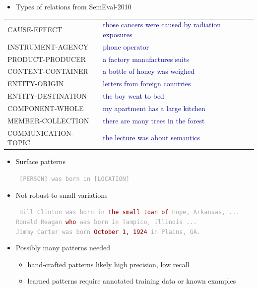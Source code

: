 \documentclass[landscape]{jhuslides3C}
\newcommand{\example}[1]{\textcolor{darkblue}{\rm #1}}
\begin{document}

\vfill
\begin{itemize}
\item Types of relations from SemEval-2010
\end{itemize}
\vfill
\begin{tabular}{ll}
\small CAUSE-EFFECT & \example{those cancers were caused by radiation exposures} \\
\small INSTRUMENT-AGENCY & \example{phone operator} \\
\small PRODUCT-PRODUCER & \example{a factory manufactures suits} \\
\small CONTENT-CONTAINER & \example{a bottle of honey was weighed} \\
\small ENTITY-ORIGIN & \example{letters from foreign countries} \\
\small ENTITY-DESTINATION & \example{the boy went to bed} \\
\small COMPONENT-WHOLE & \example{my apartment has a large kitchen}  \\
\small MEMBER-COLLECTION & \example{there are many trees in the forest}  \\
\small COMMUNICATION-TOPIC & \example{the lecture was about semantics}  \\
\end{tabular}
\vfill


\vfill
\begin{itemize}
\item Surface patterns
\textcolor{darkgrey}{\begin{flushleft} \tt
[PERSON] was born in [LOCATION]\\
\end{flushleft}}
\item Not robust to small variations
\textcolor{darkgrey}{\begin{flushleft} \tt
Bill Clinton was born in \textcolor{darkred}{the small town of} Hope, Arkansas, ...\\
Ronald Reagan \textcolor{darkred}{who} was born in Tampico, Illinois ...\\
Jimmy Carter was born \textcolor{darkred}{October 1, 1924} in Plains, GA.
\end{flushleft}}
\item Possibly many patterns needed
\begin{itemize}
\item hand-crafted patterns likely high precision, low recall
\item learned patterns require annotated training data or known examples
\end{itemize}
\end{itemize}
\vfill
\end{document}
